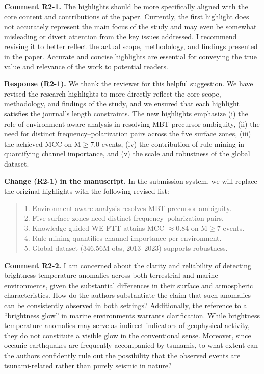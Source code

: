 \documentclass[12pt]{article}
\newcommand{\revcomment}[1]{\begingroup\color{commentcolor}#1\endgroup}
\newcommand{\revresponse}[1]{\begingroup\color{responsecolor}#1\endgroup}
\newcommand{\revchange}[1]{\begingroup\color{changecolor}#1\endgroup}
\begin{document}
\revcomment{%
\textbf{Comment R2-1.} The highlights should be more specifically aligned with the core content and contributions of the paper. Currently, the first highlight does not accurately represent the main focus of the study and may even be somewhat misleading or divert attention from the key issues addressed. I recommend revising it to better reflect the actual scope, methodology, and findings presented in the paper. Accurate and concise highlights are essential for conveying the true value and relevance of the work to potential readers.
}

\revresponse{%
\textbf{Response (R2-1).} We thank the reviewer for this helpful suggestion. We have revised the research highlights to more directly reflect the core scope, methodology, and findings of the study, and we ensured that each highlight satisfies the journal’s length constraints. The new highlights emphasize (i) the role of environment-aware analysis in resolving MBT precursor ambiguity, (ii) the need for distinct frequency--polarization pairs across the five surface zones, (iii) the achieved MCC on M$\ge$7.0 events, (iv) the contribution of rule mining in quantifying channel importance, and (v) the scale and robustness of the global dataset.
}

\revchange{%
\textbf{Change (R2-1) in the manuscript.}
In the submission system, we will replace the original highlights with the following revised list:

\begin{quote}
1. Environment-aware analysis resolves MBT precursor ambiguity.\\
2. Five surface zones need distinct frequency--polarization pairs.\\
3. Knowledge-guided WE-FTT attains MCC $\approx$0.84 on M$\ge$7 events.\\
4. Rule mining quantifies channel importance per environment.\\
5. Global dataset (346.56M obs, 2013--2023) supports robustness.
\end{quote}
}

\bigskip

\revcomment{%
\textbf{Comment R2-2.} I am concerned about the clarity and reliability of detecting brightness temperature anomalies across both terrestrial and marine environments, given the substantial differences in their surface and atmospheric characteristics. How do the authors substantiate the claim that such anomalies can be consistently observed in both settings? Additionally, the reference to a ``brightness glow'' in marine environments warrants clarification. While brightness temperature anomalies may serve as indirect indicators of geophysical activity, they do not constitute a visible glow in the conventional sense. Moreover, since oceanic earthquakes are frequently accompanied by tsunamis, to what extent can the authors confidently rule out the possibility that the observed events are tsunami-related rather than purely seismic in nature?
}
\end{document}
